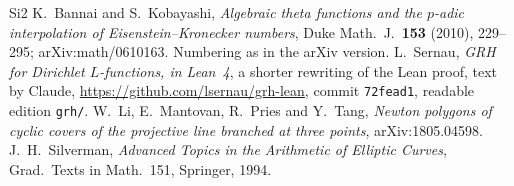 \documentclass[reqno]{amsart}
\theoremstyle{definition}
\theoremstyle{plain}
\begin{document}
\begin{thebibliography}{Si2}
 K.~Bannai and S.~Kobayashi, \emph{Algebraic theta functions and the \(p\)-adic interpolation of Eisenstein--Kronecker numbers}, Duke Math.\ J.\ \textbf{153} (2010), 229--295; arXiv:math/0610163.  Numbering as in the arXiv version.
 L.~Sernau, \emph{GRH for Dirichlet \(L\)-functions, in Lean~4}, a shorter rewriting of the Lean proof, text by Claude, \url{https://github.com/lsernau/grh-lean}, commit \texttt{72fead1}, readable edition \texttt{grh/}.
 W.~Li, E.~Mantovan, R.~Pries and Y.~Tang, \emph{Newton polygons of cyclic covers of the projective line branched at three points}, arXiv:1805.04598.
 J.~H.~Silverman, \emph{Advanced Topics in the Arithmetic of Elliptic Curves}, Grad.\ Texts in Math.\ 151, Springer, 1994.
\end{thebibliography}
\end{document}
